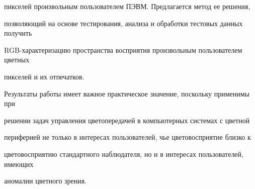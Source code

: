 пикселей  произвольным пользователем ПЭВМ.  Предлагается метод ее решения,


позволяющий на основе тестирования, анализа и обработки тестовых данных получить


RGB-характеризацию пространства восприятия произвольным пользователем цветных


пикселей и их отпечатков.





Результаты работы имеет важное практическое значение, поскольку применимы при


решении задач управления цветопередачей в компьютерных системах с цветной


периферией не только в интересах пользователей, чье цветовосприятие близко к


цветовосприятию стандартного наблюдателя, но и в интересах пользователей, имеющих


аномалии цветного зрения.








